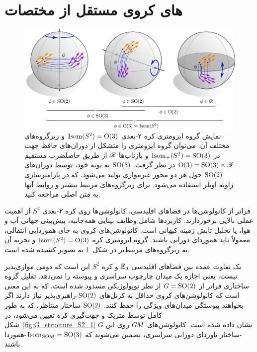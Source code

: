 

\section{های کروی مستقل از مختصات}
\label{sec:instantiations_spherical}

\begin{figure}
    \centering
    \includegraphics[width=1.\textwidth]{figures/isometry_sphere.pdf}
    \caption{\small
        نمایش گروه ایزومتری کره ۲-بعدی $\operatorname{Isom}(S^2) = \operatorname{O}(3)$ و زیرگروه‌های مختلف آن.
        می‌توان گروه ایزومتری را متشکل از دوران‌های حافظ جهت در $\operatorname{Isom}_+(S^2) = \operatorname{SO}(3)$ و بازتاب‌ها $\mathscr{R}$ از طریق حاصلضرب مستقیم $\operatorname{O}(3) = \operatorname{SO}(3) \times \mathscr{R}$ در نظر گرفت.
        $\operatorname{SO}(3)$ به نوبه خود، توسط دوران‌های $\operatorname{SO}(2)$ حول هر دو محور غیرموازی تولید می‌شود، که در پارامترسازی زاویه اویلر استفاده می‌شود.
        برای زیرگروه‌های مرتبط بیشتر و روابط آنها به متن اصلی مراجعه کنید.
    }
    \label{fig:isometries_sphere}
\end{figure}


فراتر از کانولوشن‌ها در فضاهای اقلیدسی، کانولوشن‌ها روی کره ۲-بعدی $S^2$ از اهمیت عملی بالایی برخوردارند.
کاربردها شامل وظایف بینایی همه‌جانبه، پیش‌بینی جهانی آب و هوا، یا تحلیل تابش زمینه کیهانی است.
کانولوشن‌های کروی به جای هموردایی انتقالی، معمولاً باید هموردای دورانی باشند.
گروه ایزومتری کره $\operatorname{Isom}(S^2) = \operatorname{O}(3)$ و تجزیه آن به زیرگروه‌های مرتبط‌تر در شکل~\ref{fig:isometries_sphere} به تصویر کشیده شده است.

یک تفاوت عمده بین فضاهای اقلیدسی $\mathbb{E}_d$ و کره $S^2$ این است که دومی موازی‌پذیر نیست، یعنی اجازه یک میدان چارچوب سراسری و پیوسته را نمی‌دهد.
تقلیل گروه ساختاری فراتر از $G=\operatorname{SO}(2)$ از نظر توپولوژیکی مسدود شده است، که به این معنی است که کانولوشن‌های کروی حداقل به کرنل‌های $\operatorname{SO}(2)$-راهبری‌پذیر نیاز دارند اگر بخواهند پیوستگی میدان‌های ویژگی را حفظ کنند.
$\operatorname{SO}(2)$-ساختار متناظر، که به طور کامل توسط متریک و جهت‌گیری کره تعیین می‌شود، در شکل~\ref{fig:G_structure_S2_1} نشان داده شده است.
کانولوشن‌های $G\mkern-1.4muM$ روی این $G$-ساختار ناوردای دورانی سراسری، تضمین می‌شوند که $\operatorname{Isom}_{\mkern1mu\operatorname{SO}\mkern-3.6muM} = \operatorname{SO}(3)$-هموردا باشند.

